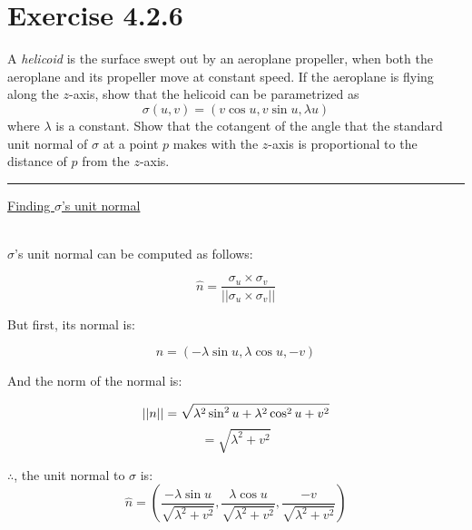 \documentclass[12pt]{article}
\newcommand{\ulind}[1]
{
\noindent
\underline{#1}\\\\
\indent
}
\begin{document}
\maketitle

\section*{Exercise 4.2.6}
\indent
A \emph{helicoid} is the surface swept out by an aeroplane propeller, when both the aeroplane and its propeller move at constant speed. If the aeroplane is flying along the $z$-axis, show that the helicoid can be parametrized as
$$
\sigma(u, v) = (v \cos u, v \sin u, \lambda u)
$$
where $\lambda$ is a constant. Show that the cotangent of the angle that the standard unit normal of $\sigma$ at a point $p$ makes with the $z$-axis is proportional to the distance of $p$ from the $z$-axis.

\vspace{1cm}
\hrule
\vspace{1cm}
\noindent

\ulind{Finding $\sigma$'s unit normal}
$\sigma$'s unit normal can be computed as follows:

$$
\hat{n} = \frac{\sigma_u \times \sigma_v}{||\sigma_u \times \sigma_v||}
$$

But first, its normal is:

$$
n = (-\lambda \sin u, \lambda \cos u, -v)
$$

And the norm of the normal is:

$$
||n|| = \sqrt{\lambda^2 \sin^2 u + \lambda^2 \cos^2 u + v^2}\\
$$
$$
= \sqrt{\lambda^2 + v^2}
$$

$\therefore$, the unit normal to $\sigma$ is:
$$
\hat{n} = \left(\frac{-\lambda \sin u}{\sqrt{\lambda^2+v^2}}, \frac{\lambda \cos u}{\sqrt{\lambda^2+v^2}}, \frac{-v}{\sqrt{\lambda^2+v^2}}\right)
$$
\end{document}
